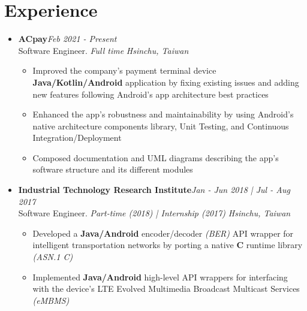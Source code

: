 \section{\sectionheading Experience}

\begin{itemize}[leftmargin=0pt, label={}]%

\item{
{\sectionheading\large{\textbf{ACpay}}}\hfill {\sectionheading\small{\textit{Feb 2021 - Present}}}\\
{\sectionheading\small{Software Engineer. \textit{Full time}}}\hfill
{\sectionheading\small{\textit{Hsinchu, Taiwan}}}

    \vspace{-6pt}
    \begin{itemize}[label=\textbullet, leftmargin=*, noitemsep]
        \item{Improved the company's payment terminal device \textbf{Java/Kotlin/Android} application by fixing existing issues and adding new features following Android's app architecture best practices}
        \item{Enhanced the app's robustness and maintainability by using Android's native architecture components library, Unit Testing, and Continuous Integration/Deployment}
        \item{Composed documentation and UML diagrams describing the app's software structure and its different modules}
    \end{itemize}
}

\item{
{\sectionheading\large{\textbf{Industrial Technology Research Institute}}}\hfill {\sectionheading\small{\textit{Jan - Jun 2018 | Jul - Aug 2017}}}\\
{\sectionheading\small{Software Engineer. \textit{Part-time (2018) | Internship (2017)}}}\hfill
{\sectionheading\small{\textit{Hsinchu, Taiwan}}}

    \vspace{-6pt}
    \begin{itemize}[label=\textbullet, leftmargin=*, noitemsep]
        \item{Developed a \textbf{Java/Android} encoder/decoder \textit{(BER)} API wrapper for intelligent transportation networks by porting a native \textbf{C} runtime library \textit{(ASN.1 C)}}
        \item{Implemented \textbf{Java/Android} high-level API wrappers for interfacing with the device's LTE Evolved Multimedia Broadcast Multicast Services \textit{(eMBMS)}}
    \end{itemize}
}


\end{itemize}
